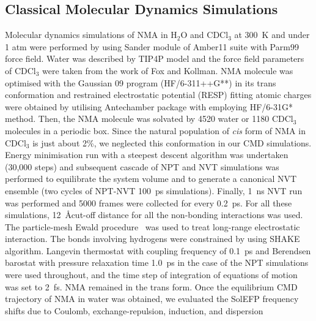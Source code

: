 \documentclass[a4paper,titlepage,twoside,fleqn,12pt]{book}
\begin{document}
\begin{appendices}
\begin{refsection}
\subsection{Classical Molecular Dynamics Simulations}

Molecular dynamics simulations of NMA in H$_2$O and
CDCl$_3$ at 300~K and under 1 atm were performed by using
Sander module of {\sc Amber11} suite \citep{AMBER.11.2009} 
with Parm99 force field. \citep{Wang.Cieplak.Kollman.JCC.2000}
Water was described by TIP4P model \citep{Jorgensen.Chandrasekhar.Madura.Impey.Klein.JCP.1983} 
and the force field
parameters of CDCl$_3$ were taken from the work of Fox and
Kollman. \citep{Fox.Kollman.JPCB.1998} 
NMA molecule was optimised with the {\sc Gaussian 09}
program (HF/6-311++G**) in its trans conformation
and restrained electrostatic potential (RESP) fitting atomic
charges \citep{Bayly.Cieplak.Cornell.Kollman.JPC.1993} 
were obtained by utilising {\sc Antechamber} package \citep{Antechamber.JMGM.2006}
with employing HF/6-31G* method. \citep{Hariharan.Pople.TCA.1973} 
Then, the NMA
molecule was solvated by 4520 water or 1180 CDCl$_3$
molecules in a periodic box. Since the natural population of
\emph{cis} form of NMA in CDCl$_3$ is just about 2\%, we neglected this
conformation in our CMD simulations. \citep{Akiyama.Ohtani.SpectActA.1994}
Energy minimisation
run with a steepest descent algorithm was undertaken (30,000
steps) and subsequent cascade of NPT and NVT simulations
was performed to equilibrate the system volume and to
generate a canonical NVT ensemble (two cycles of NPT\hyp{}NVT
100~ps simulations). Finally, 1~ns NVT run was performed
and 5000 frames were collected for every 0.2~ps. For all these
simulations, 12~\AA cut\hyp{}off distance for all the non-bonding
interactions was used. The particle\hyp{}mesh Ewald 
procedure~\citep{Darden.York.Pedersen.JCP.1993}
was used to treat long\hyp{}range electrostatic interaction. The
bonds involving hydrogens were constrained by using SHAKE
algorithm. \citep{Ryckaert.Ciccotti.Berendsen.JComputPhys.1977} 
Langevin thermostat \citep{Izaguirre.Catarello.Wozniak.Skeel.JCP.2001}
with coupling frequency
of 0.1~ps and Berendsen barostat \citep{Berendsen.Postma.Gunsteren.DiNola.Haak.JCP.1984} 
with pressure relaxation
time 1.0~ps in the case of the NPT simulations were used
throughout, and the time step of integration of equations of
motion was set to 2~fs. NMA remained in the trans form.
Once the equilibrium CMD trajectory of NMA in water
was obtained, we evaluated the SolEFP frequency shifts due
to Coulomb, exchange\hyp{}repulsion, induction, and dispersion

\end{refsection}
\end{appendices}
\end{document}
